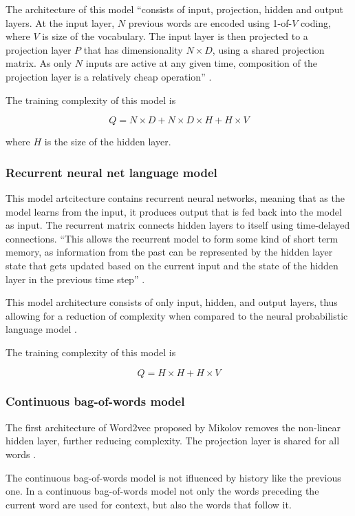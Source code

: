 \documentclass[14pt, a4paper]{extreport}
\begin{document}
The architecture of this model ``consists of input, projection, hidden and output layers. At the input layer, \(N\) previous words are encoded using 1-of-\(V\) coding, where \(V\) is size of the vocabulary. The input layer is then projected to a projection layer \(P\) that has dimensionality \(N \times D\), using a shared projection matrix. As only \(N\) inputs are active at any given time, composition of the projection layer is a relatively cheap operation'' \parencite{mikolov}.

The training complexity of this model is

\[Q = N \times D + N \times D \times H + H \times V\]

where \(H\) is the size of the hidden layer.


\subsubsection{Recurrent neural net language model}
This model artcitecture contains recurrent neural networks, meaning that as the model learns from the input, it produces output that is fed back into the model as input. The recurrent matrix connects hidden layers to itself using time-delayed connections. ``This allows the recurrent model to form some kind of short term memory, as information from the past can be represented by the hidden layer state that gets updated based on the current input and the state of the hidden layer in the previous time step'' \parencite{mikolov}.

This model architecture consists of only input, hidden, and output layers, thus allowing for a reduction of complexity when compared to the neural probabilistic language model \parencite{mikolov}.

The training complexity of this model is

\[Q = H \times H + H \times V\]

\subsubsection{Continuous bag-of-words model}
The first architecture of Word2vec proposed by Mikolov removes the non-linear hidden layer, further reducing complexity. The projection layer is shared for all words \parencite{mikolov}.

The continuous bag-of-words model is not ifluenced by history like the previous one. In a continuous bag-of-words model not only the words preceding the current word are used for context, but also the words that follow it.
\end{document}
